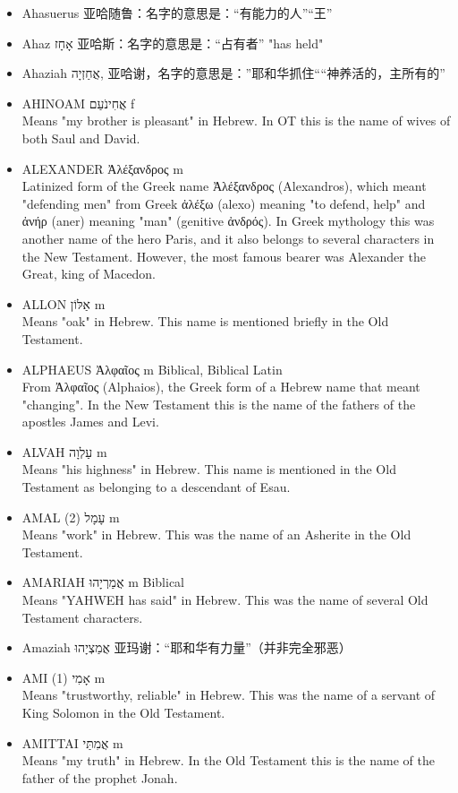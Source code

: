 \begin{itemize}
\item Ahasuerus  亚哈随鲁：名字的意思是：“有能力的人”“王”
\item Ahaz אָחָז 亚哈斯：名字的意思是：“占有者” "has held"
\item Ahaziah  אֲחַזְיָה, 亚哈谢，名字的意思是：”耶和华抓住““神养活的，主所有的”
\item {AHINOAM אֲחִינֹעַם f}\\
Means "my brother is pleasant" in Hebrew. In OT this is the name of wives of both Saul and David.
\item {ALEXANDER Ἀλέξανδρος m}\\
Latinized form of the Greek name Ἀλέξανδρος (Alexandros), which meant "defending men" from Greek ἀλέξω (alexo) meaning "to defend, help" and ἀνήρ (aner) meaning "man" (genitive ἀνδρός). In Greek mythology this was another name of the hero Paris, and it also belongs to several characters in the New Testament. However, the most famous bearer was Alexander the Great, king of Macedon. 
\item {ALLON אַלּוֹן m}\\
Means "oak" in Hebrew. This name is mentioned briefly in the Old Testament.
\item {ALPHAEUS Ἀλφαῖος m Biblical, Biblical Latin}\\
From Ἀλφαῖος (Alphaios), the Greek form of a Hebrew name that meant "changing". In the New Testament this is the name of the fathers of the apostles James and Levi.
\item {ALVAH עַלְוָה m}\\
Means "his highness" in Hebrew. This name is mentioned in the Old Testament as belonging to a descendant of Esau.
\item {AMAL (2) עָמָל m}\\
Means "work" in Hebrew. This was the name of an Asherite in the Old Testament.
\item {AMARIAH אֲמַרְיָהוּ m Biblical}\\
Means "YAHWEH has said" in Hebrew. This was the name of several Old Testament characters.
\item Amaziah אֲמַצְיָהוּ 亚玛谢：“耶和华有力量”（并非完全邪恶）
\item {AMI (1) אָמִי m}\\
Means "trustworthy, reliable" in Hebrew. This was the name of a servant of King Solomon in the Old Testament.
\item {AMITTAI אֲמִתַּי m}\\
Means "my truth" in Hebrew. In the Old Testament this is the name of the father of the prophet Jonah.

\end{itemize}
